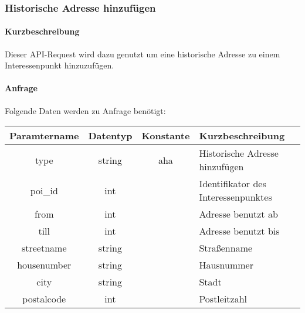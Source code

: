\subsubsection{Historische Adresse hinzufügen}
\paragraph{Kurzbeschreibung}Dieser API-Request wird dazu genutzt um eine historische Adresse zu einem Interessenpunkt hinzuzufügen.
\paragraph{Anfrage}Folgende Daten werden zu Anfrage benötigt:
\begin{table}[H]
	\begin{tabular}{|c|c|c|p{6.5cm}|}
		\hline
		\textbf{Paramtername} & \textbf{Datentyp} & \textbf{Konstante} & \textbf{Kurzbeschreibung}                                                                                               \\ \hline
		type                & string            & aha                & Historische Adresse hinzufügen \\ \hline
		poi\_id             & int               &                    & Identifikator des Interessenpunktes \\ \hline
		from                & int               &                    & Adresse benutzt ab \\ \hline
		till                & int               &                    & Adresse benutzt bis \\ \hline
		streetname          & string            &                    & Straßenname \\ \hline
		housenumber         & string            &                    & Hausnummer \\ \hline
		city                & string            &                    & Stadt \\ \hline
		postalcode          & int               &                    & Postleitzahl \\ \hline
	\end{tabular}
\end{table}

